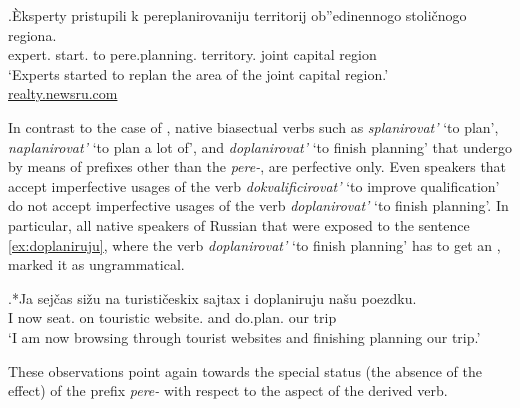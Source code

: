 \exg.\label{ex:pereplanirovanie}\`{E}ksperty pristupili k pereplanirovaniju territorij ob''edinennogo stoli\v{c}nogo regiona.\\
expert. start. to pere.planning. territory. joint capital region\\
\trans `Experts started to replan the area of the joint capital region.'\\\hbox{}\hfill\hbox{\url{realty.newsru.com}}

In contrast to the case of  , native biasectual verbs such as \textit{splanirovat'} `to plan', \textit{naplanirovat'} `to plan a lot of', and \textit{doplanirovat'} `to finish planning' that undergo  by means of prefixes other than the  \textit{pere-}, are perfective only. Even speakers that accept imperfective usages of the verb \textit{dokvalificirovat'} `to improve qualification' do not accept imperfective usages of the verb \textit{doplanirovat'} `to finish planning'. In particular, all native speakers of Russian that were exposed to the sentence \ref{ex:doplaniruju}, where the verb \textit{doplanirovat'} `to finish planning' has to get an , marked it as ungrammatical.

\exg.*Ja sej\v{c}as si\v{z}u na turisti\v{c}eskix sajtax i doplaniruju na\v{s}u poezdku.\label{ex:doplaniruju}\\
I now seat. on touristic website. and do.plan. our trip\\
\trans `I am now browsing through tourist websites and finishing planning our trip.'\largerpage

These observations point again towards the special status (the absence of the  effect) of the prefix \textit{pere-} with respect to the aspect of the derived verb.

